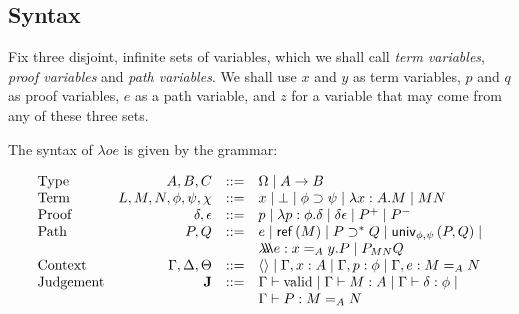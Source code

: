 
\subsection{Syntax}

Fix three disjoint, infinite sets of variables, which we shall call \emph{term variables}, \emph{proof variables}
and \emph{path variables}.  We shall use $x$ and $y$ as term variables, $p$ and $q$ as proof variables,
$e$ as a path variable, and $z$ for a variable that may come from any of these three sets.

The syntax of $\lambda o e$ is given by the grammar:

\[
\begin{array}{lrcl}
\text{Type} & A,B,C & ::= & \Omega \mid A \rightarrow B \\
\text{Term} & L,M,N, \phi,\psi,\chi & ::= & x \mid \bot \mid \phi \supset \psi \mid \lambda x:A.M \mid MN \\
\text{Proof} & \delta, \epsilon & ::= & p \mid \lambda p:\phi.\delta \mid \delta \epsilon \mid P^+ \mid P^- \\
\text{Path} & P, Q & ::= & e \mid \mathsf{ref} \left( {M} \right) \mid P \supset^* Q \mid \mathsf{univ}_{{\phi} , {\psi}} \left( {P} , {Q} \right) \mid \\
& & & \lambda \!\! \lambda \!\! \lambda e : x =_A y. P \mid P_{MN} Q \\
\text{Context} & \Gamma, \Delta, \Theta & ::= & \langle \rangle \mid \Gamma, x : A \mid \Gamma, p : \phi \mid \Gamma, e : M =_A N \\
\text{Judgement} & \mathbf{J} & ::= & \Gamma \vdash \mathrm{valid} \mid \Gamma \vdash M : A \mid \Gamma \vdash \delta : \phi \mid \\
& & & \Gamma \vdash P : M =_A N
\end{array}
\]

